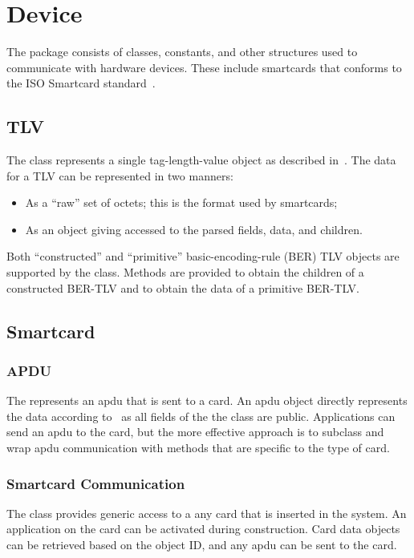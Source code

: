 %
%
\chapter{Device}
\label{chp-device}
The  package consists of classes, constants, and other
structures used to communicate with hardware devices. These include
smartcards that conforms to the ISO Smartcard standard~\cite{std:iso7816-4}.

\section{TLV}
The  class represents a single tag-length-value object as described
in~\cite{std:iso7816-4}. The data for a TLV can be represented in two manners:
\begin{itemize}
\item As a ``raw'' set of octets; this is the format used by smartcards;
\item As an object giving accessed to the parsed fields, data, and children.
\end{itemize}

Both ``constructed'' and ``primitive'' basic-encoding-rule (BER) TLV objects
are supported by the  class. Methods are provided to obtain the
children of a constructed BER-TLV and to obtain the data of a primitive
BER-TLV.

\section{Smartcard}
\subsection{APDU}

The  represents an \gls{apdu} that is sent to a card. An \gls{apdu}
object directly represents the data according to~\cite{std:iso7816-4} as all
fields of the the class are public. Applications can send an \gls{apdu} to the
card, but the more effective approach is to subclass  and wrap
\gls{apdu} communication with methods that are specific to the type of card.

\subsection{Smartcard Communication}

The  class provides generic access to a any card that is
inserted
in the system. An application on the card can be activated during construction.
Card data objects can be retrieved based on the object ID, and any \gls{apdu}
can be sent to the card.

